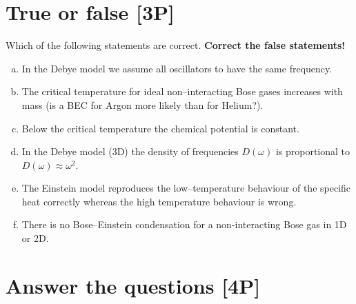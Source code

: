 \documentclass[12pt,a4paper]{article} %
\begin{document}
\section{True or false [3P]}


Which of the following statements are correct. \textbf{Correct the false statements!}
\begin{enumerate}[a)]
  \item In the Debye model we assume all oscillators to have the same frequency.
  \item The critical temperature for ideal non--interacting Bose gases increases with mass (is a BEC for Argon more likely than for Helium?).
  \item Below the critical temperature the chemical potential is constant.
  \item In the Debye model (3D) the density of frequencies $D(\omega)$ is proportional to $D(\omega) \approx \omega^2$.
  \item The Einstein model reproduces the low--temperature behaviour of the specific heat correctly whereas the high temperature behaviour is wrong.
  \item There is no Bose--Einstein condensation for a non-interacting Bose gas in 1D or 2D.
\end{enumerate}


\section{Answer the questions [4P]}
\end{document}
